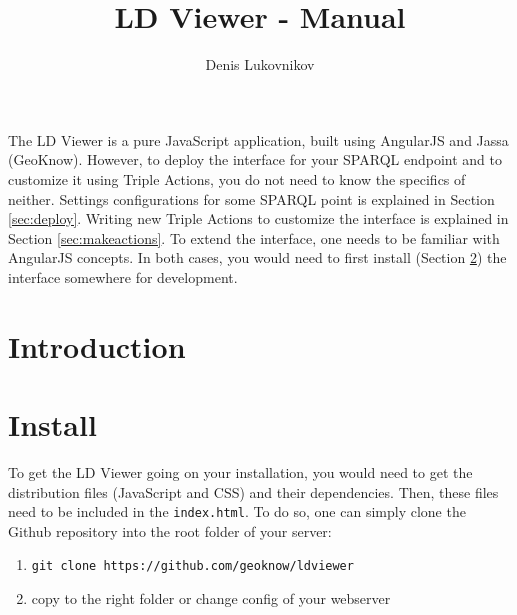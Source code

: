 \documentclass{article}
\begin{document}
\title{LD Viewer - Manual}
\author{Denis Lukovnikov}
\maketitle

The LD Viewer is a pure JavaScript application, built using AngularJS and Jassa (GeoKnow).
However, to deploy the interface for your SPARQL endpoint and to customize it using Triple Actions, you do not need to know the specifics of neither.
Settings configurations for some SPARQL point is explained in Section \ref{sec:deploy}.
Writing new Triple Actions to customize the interface is explained in Section \ref{sec:makeactions}.
To extend the interface, one needs to be familiar with AngularJS concepts.
In both cases, you would need to first install (Section \ref{sec:install}) the interface somewhere for development.

\section{Introduction}
\label{sec:intro}

\section{Install}
\label{sec:install}
To get the LD Viewer going on your installation, you would need to get the distribution files (JavaScript and CSS) and their dependencies.
Then, these files need to be included in the \texttt{index.html}.
To do so, one can simply clone the Github repository into the root folder of your server:
\begin{enumerate}
\item \texttt{git clone https://github.com/geoknow/ldviewer}
\item copy to the right folder or change config of your webserver
\end{enumerate}
\end{document}
